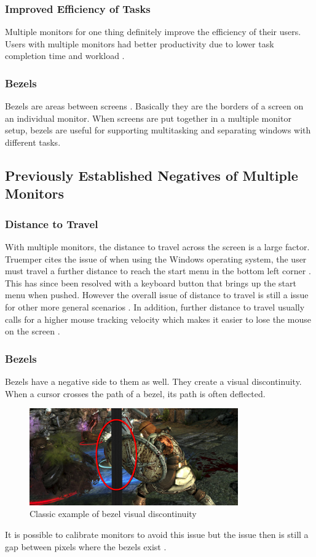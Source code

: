 \documentclass[a4paper]{article}
\begin{document}
\subsubsection{Improved Efficiency of Tasks}
Multiple monitors for one thing definitely improve the efficiency of their users. Users with multiple monitors had better productivity due to lower task completion time and workload \cite{Kang}.

\subsubsection{Bezels}
Bezels are areas between screens \cite{Truemper}. Basically they are the borders of a screen on an individual monitor. When screens are put together in a multiple monitor setup, bezels are useful for supporting multitasking and separating windows with different tasks.



\subsection{Previously Established Negatives of Multiple Monitors}

\subsubsection{Distance to Travel}
With multiple monitors, the distance to travel across the screen is a large factor. Truemper cites the issue of when using the Windows operating system, the user must travel a further distance to reach the start menu in the bottom left corner \cite{Truemper}. This has since been resolved with a keyboard button that brings up the start menu when pushed. However the overall issue of distance to travel is still a issue for other more general scenarios \cite{Truemper}. In addition, further distance to travel usually calls for a higher mouse tracking velocity which makes it easier to lose the mouse on the screen \cite{Truemper}.

\subsubsection{Bezels}
Bezels have a negative side to them as well. They create a visual discontinuity.  When a cursor crosses the path of a bezel, its path is often deflected.
\begin{figure}[H]
\centering
\includegraphics[width=0.8\textwidth]{bezel-example.jpg}
\caption{Classic example of bezel visual discontinuity}
\end{figure}
It is possible to calibrate monitors to avoid this issue but the issue then is still a gap between pixels where the bezels exist \cite{Truemper}.
\end{document}
